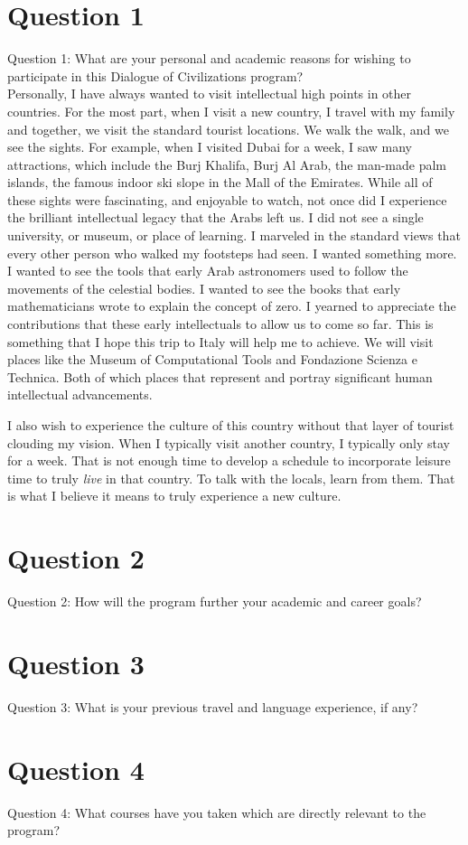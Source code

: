 \documentclass{article}
\begin{document}
\section{Question 1}
Question 1: What are your personal and academic reasons for wishing to
participate in this Dialogue of Civilizations program?\\

Personally, I have always wanted to visit intellectual high points in other
countries. For the most part, when I visit a new country, I travel with my
family and together, we visit the standard tourist locations. We walk the walk,
and we see the sights. For example, when I visited Dubai for a week, I saw many
attractions, which include the Burj Khalifa, Burj Al Arab, the man-made palm
islands, the famous indoor ski slope in the Mall of the Emirates. While all of
these sights were fascinating, and enjoyable to watch, not once did I experience
the brilliant intellectual legacy that the Arabs left us. I did not see a single
university, or museum, or place of learning. I marveled in the standard views
that every other person who walked my footsteps had seen. I wanted something
more. I wanted to see the tools that early Arab astronomers used to follow the
movements of the celestial bodies. I wanted to see the books that early
mathematicians wrote to explain the concept of zero. I yearned to appreciate the
contributions that these early intellectuals to allow us to come so far. This is
something that I hope this trip to Italy will help me to achieve. We will visit
places like the Museum of Computational Tools and Fondazione Scienza e Technica.
Both of which places that represent and portray significant human intellectual
advancements.

I also wish to experience the culture of this country without that layer of
tourist clouding my vision. When I typically visit another country, I typically
only stay for a week. That is not enough time to develop a schedule to
incorporate leisure time to truly \textit{live} in that country. To talk with
the locals, learn from them. That is what I believe it means to truly experience
a new culture.

\section{Question 2}
Question 2: How will the program further your academic and career goals?

\section{Question 3}
Question 3: What is your previous travel and language experience, if any?

\section{Question 4}
Question 4: What courses have you taken which are directly relevant to the
program?
\end{document}
